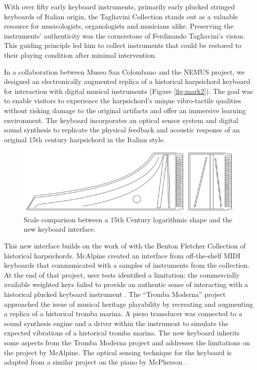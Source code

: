 With over fifty early keyboard instruments, primarily early plucked stringed keyboards of Italian origin, the Tagliavini Collection stands out as a valuable resource for musicologists, organologists and musicians alike. Preserving the instruments' authenticity was the cornerstone of Ferdinando Tagliavini’s vision. This guiding principle led him to collect instruments that could be restored to their playing condition after minimal intervention. 

In a collaboration between Museo San Colombano and the NEMUS project, we designed an electronically augmented replica of a historical harpsichord keyboard for interaction with digital musical instruments (Figure \ref{fig:mark2}). The goal was to enable visitors to experience the harpsichord’s unique vibro-tactile qualities without risking damage to the original artifacts and offer an immersive learning environment. The keyboard incorporates an optical sensor system and digital sound synthesis to replicate the physical feedback and acoustic response of an original 15th century harpsichord in the Italian style.

\begin{figure}
    \centering
    \includegraphics[width=1\linewidth]{img/comparison.png}
    \caption{Scale comparison between a 15th Century logarithmic shape and the new keyboard interface.}
    \label{fig:log-harp-comp}
\vfill\end{figure}

This new interface builds on the work of \textcite{mcalpine_sampling_2014} with the Benton Fletcher Collection of historical harpsichords. 
McAlpine created an interface from off-the-shelf MIDI keyboards that communicated with a samples of instruments from the collection. At the end of that project, user tests identified a limitation: the commercially available weighted keys failed to provide an authentic sense of interacting with a historical plucked keyboard instrument \cite{mcalpine_sampling_2014}. 
The ``Tromba Moderna'' project \cite{baldwin_tromba_2016} approached the issue of musical heritage playability by recreating and augmenting a replica of a historical tromba marina. A piezo transducer was connected to a sound synthesis engine and a driver within the instrument to simulate the expected vibrations of a historical tromba marina. The new keyboard inherits some aspects from the Tromba Moderna project and addresses the limitations on the project by McAlpine. The optical sensing technique for the keyboard is adapted from a similar project on the piano by McPherson \cite{mcpherson_portable_2013}.


